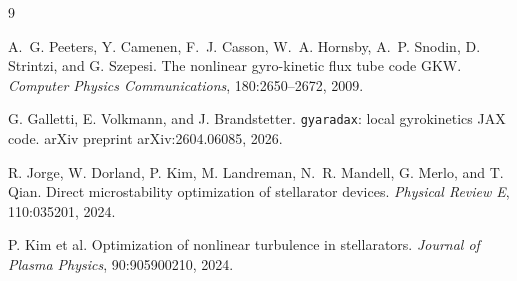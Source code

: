 \documentclass[11pt,a4paper]{article}
\begin{document}
\begin{thebibliography}{9}

A.~G. Peeters, Y. Camenen, F.~J. Casson, W.~A. Hornsby, A.~P. Snodin, D. Strintzi, and G. Szepesi.
\newblock The nonlinear gyro-kinetic flux tube code GKW.
\newblock \emph{Computer Physics Communications}, 180:2650--2672, 2009.

G. Galletti, E. Volkmann, and J. Brandstetter.
\newblock \texttt{gyaradax}: local gyrokinetics JAX code.
\newblock arXiv preprint arXiv:2604.06085, 2026.

R. Jorge, W. Dorland, P. Kim, M. Landreman, N.~R. Mandell, G. Merlo, and T. Qian.
\newblock Direct microstability optimization of stellarator devices.
\newblock \emph{Physical Review E}, 110:035201, 2024.

P. Kim et al.
\newblock Optimization of nonlinear turbulence in stellarators.
\newblock \emph{Journal of Plasma Physics}, 90:905900210, 2024.

\end{thebibliography}
\end{document}
